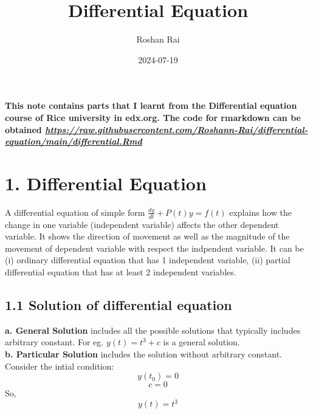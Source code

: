 \documentclass[
  11pt,
]{article}
\title{Differential Equation}
\author{Roshan Rai}
\date{2024-07-19}
\begin{document}
\maketitle

\onehalfspacing

\textbf{This note contains parts that I learnt from the Differential
equation course of Rice university in edx.org. The code for rmarkdown
can be obtained
\href{https://raw.githubusercontent.com/Roshann-Rai/differential-equation/main/differential.Rmd}{\emph{https://raw.githubusercontent.com/Roshann-Rai/differential-equation/main/differential.Rmd}}}

\section{1. Differential Equation}\label{differential-equation}

A differential equation of simple form \(\frac{dy}{dt} + P(t)y = f(t)\)
explains how the change in one variable (independent variable) affects
the other dependent variable. It shows the direction of movement as well
as the magnitude of the movement of dependent variable with respect the
indpendent variable. It can be (i) ordinary differential equation that
has 1 independent variable, (ii) partial differential equation that has
at least 2 independent variables.

\subsection{1.1 Solution of differential
equation}\label{solution-of-differential-equation}

\textbf{a. General Solution} includes all the possible solutions that
typically includes arbitrary constant. For eg. \(y(t) = t^3 + c\) is a
general solution.\\
\textbf{b. Particular Solution} includes the solution without arbitrary
constant. Consider the intial condition: \[y(t_0) = 0\] \[c = 0\] So,
\[y(t) = t^3\] \clearpage
\end{document}
